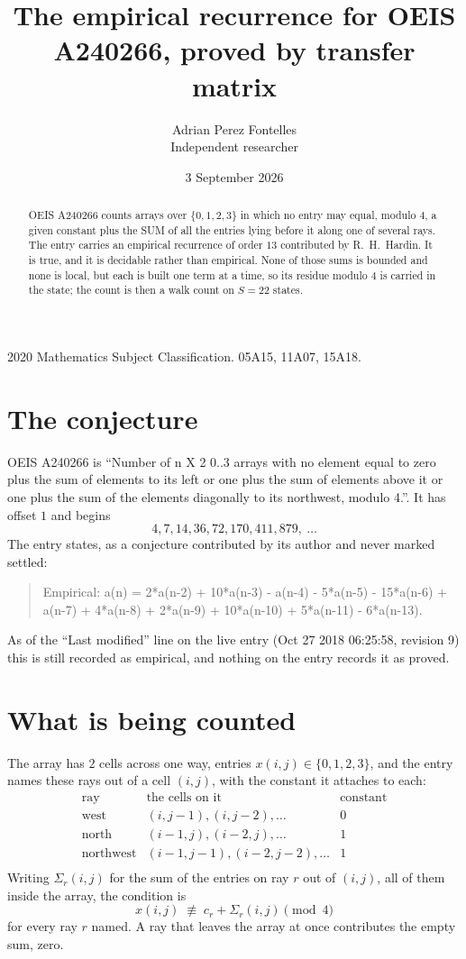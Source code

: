 \documentclass[11pt,a4paper]{article}
\title{The empirical recurrence for OEIS A240266, proved by transfer matrix}
\author{Adrian Perez Fontelles\\ \small Independent researcher}
\date{3 September 2026}
\theoremstyle{plain}
\theoremstyle{definition}
\begin{document}
\maketitle

\begin{abstract}
OEIS A240266 counts arrays over $\{0,1,2,3\}$ in which no entry may equal, modulo $4$, a given
constant plus the SUM of all the entries lying before it along one of several rays. The entry
carries an empirical recurrence of order $13$ contributed by R.~H.~Hardin. It is true, and
it is decidable rather than empirical. None of those sums is bounded and none is local, but
each is built one term at a time, so its residue modulo $4$ is carried in the state; the
count is then a walk count on $S=22$ states.
\end{abstract}

\noindent\small 2020 Mathematics Subject Classification. 05A15, 11A07, 15A18.\normalsize

\section{The conjecture}

OEIS A240266 is ``Number of n X 2 0..3 arrays with no element equal to zero plus the sum of elements to its left or one plus the sum of elements above it or one plus the sum of the elements diagonally to its northwest, modulo 4.''. It has offset $1$ and begins
\[
4, 7, 14, 36, 72, 170, 411, 879,\ \dots
\]
The entry states, as a conjecture contributed by its author and never marked settled:
\begin{quote}
Empirical: a(n) = 2*a(n-2) + 10*a(n-3) - a(n-4) - 5*a(n-5) - 15*a(n-6) + a(n-7) + 4*a(n-8) + 2*a(n-9) + 10*a(n-10) + 5*a(n-11) - 6*a(n-13).
\end{quote}
As of the ``Last modified'' line on the live entry (Oct 27 2018 06:25:58, revision 9) this is still
recorded as empirical, and nothing on the entry records it as proved.

\section{What is being counted}

The array has $2$ cells across one way, entries $x(i,j)\in\{0,1,2,3\}$, and the entry names these
rays out of a cell $(i,j)$, with the constant it attaches to each:
\[
\begin{array}{lll}
\text{ray} & \text{the cells on it} & \text{constant} \\[2pt]
\text{west} & (i,j-1),(i,j-2),\dots & 0 \\
\text{north} & (i-1,j),(i-2,j),\dots & 1 \\
\text{northwest} & (i-1,j-1),(i-2,j-2),\dots & 1 \\
\end{array}
\]
Writing $\Sigma_r(i,j)$ for the sum of the entries on ray $r$ out of $(i,j)$, all of them
inside the array, the condition is
\[
x(i,j)\;\not\equiv\;c_r+\Sigma_r(i,j) \pmod{4}
\]
for every ray $r$ named. A ray that leaves the array at once contributes the empty sum,
zero.
\end{document}
